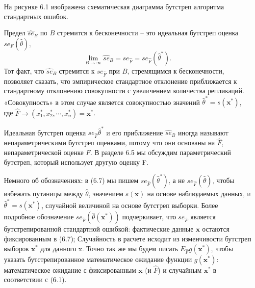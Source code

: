 На рисунке 6.1 изображена схематическая диаграмма бутстреп алгоритма стандартных ошибок. 

Предел $\widehat{se}_B$ по $B$ стремится к бесконечности -- это идеальная бутстреп оценка $se_F(\hat\theta)$,
\begin{equation}
    \lim_{B\rightarrow\infty}\widehat{se}_B=se_{\hat F}=se_{\hat F}(\hat\theta^*).
\end{equation}
Тот факт, что $\widehat{se}_B$ стремится к $se_{\hat F}$ при $B$, стремящимся к бесконечности, позволяет сказать, что эмпирическое стандартное отклонение приближается к стандартному отклонению совокупности с увеличением количества репликаций. «Совокупность» в этом случае является совокупностью значений $\hat\theta^*=s(\mathbf{x}^*)$, где $\hat F \rightarrow (x_1^*, x_2^*, \cdots, x_n^*) = \mathbf{x}^*$. 

Идеальная бутстреп оценка $se_{\hat F}\hat\theta^*$ и его приближение $\widehat{se}_B$ иногда называют непараметрическими бутстреп оценками, потому что они основаны на $\hat F$, непараметрической оценке $F$. В разделе 6.5 мы обсуждим параметрический бутстреп, который использует другую оценку F. 

Немного об обозначениях: в (6.7) мы пишем $se_{\hat F}(\hat\theta^*)$, а не $se_{\hat F}(\hat\theta)$, чтобы избежать путаницы между $\hat\theta$, значением $s (\mathbf{x})$ на основе наблюдаемых данных, и $\hat\theta^* = s (\mathbf{x}^*)$, случайной величиной на основе бутстреп выборки. Более подробное обозначение $se_{\hat F} (\hat\theta (\mathbf{x}^*))$ подчеркивает, что $se_{\hat F}$ является бутстрепированной стандартной ошибкой: фактические данные $\mathbf{x}$ остаются фиксированным в (6.7); Случайность в расчете исходит из изменчивости бутстреп выборок $\mathbf{x}^*$ для данного x. Точно так же мы будем писать $E_{\hat F}g(\mathbf{x^*})$, чтобы указать бутстрепированное математическое ожидание функции $g (\mathbf{x}^*)$: математическое ожидание с фиксированным $\mathbf{x}$ (и $\hat F$) и случайным $\mathbf{x}^*$ в соответствии с (6.1). 
\newline

